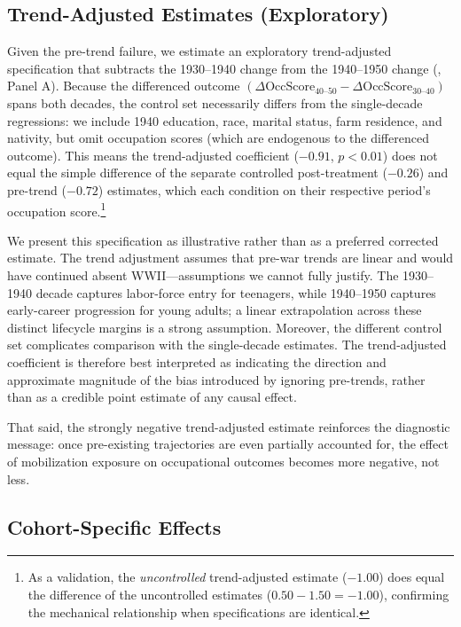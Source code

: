 \documentclass[12pt]{article}
\begin{document}
\subsection{Trend-Adjusted Estimates (Exploratory)}

Given the pre-trend failure, we estimate an exploratory trend-adjusted specification that subtracts the 1930--1940 change from the 1940--1950 change (, Panel A). Because the differenced outcome $(\Delta\text{OccScore}_{40\text{--}50} - \Delta\text{OccScore}_{30\text{--}40})$ spans both decades, the control set necessarily differs from the single-decade regressions: we include 1940 education, race, marital status, farm residence, and nativity, but omit occupation scores (which are endogenous to the differenced outcome). This means the trend-adjusted coefficient ($-0.91$, $p < 0.01$) does not equal the simple difference of the separate controlled post-treatment ($-0.26$) and pre-trend ($-0.72$) estimates, which each condition on their respective period's occupation score.\footnote{As a validation, the \textit{uncontrolled} trend-adjusted estimate ($-1.00$) does equal the difference of the uncontrolled estimates ($0.50 - 1.50 = -1.00$), confirming the mechanical relationship when specifications are identical.}

We present this specification as illustrative rather than as a preferred corrected estimate. The trend adjustment assumes that pre-war trends are linear and would have continued absent WWII---assumptions we cannot fully justify. The 1930--1940 decade captures labor-force entry for teenagers, while 1940--1950 captures early-career progression for young adults; a linear extrapolation across these distinct lifecycle margins is a strong assumption. Moreover, the different control set complicates comparison with the single-decade estimates. The trend-adjusted coefficient is therefore best interpreted as indicating the direction and approximate magnitude of the bias introduced by ignoring pre-trends, rather than as a credible point estimate of any causal effect.

That said, the strongly negative trend-adjusted estimate reinforces the diagnostic message: once pre-existing trajectories are even partially accounted for, the effect of mobilization exposure on occupational outcomes becomes more negative, not less.

\subsection{Cohort-Specific Effects}
\end{document}
